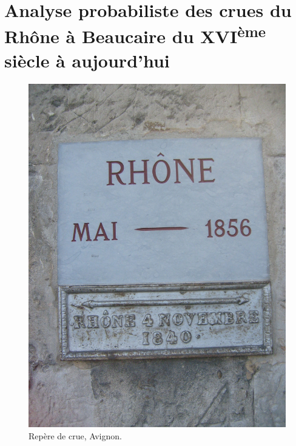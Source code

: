% 
%
%
%
%

\chapter{Analyse probabiliste des crues du Rhône à Beaucaire du XVI\textsuperscript{ème} siècle à aujourd'hui}
\label{chap:ch4}

\begin{figure}[h]
	\centering
		\includegraphics[width=.5\linewidth]{Chapitre4/Figures/Repère.jpg}
        \caption{Repère de crue, Avignon.}	
\end{figure}

